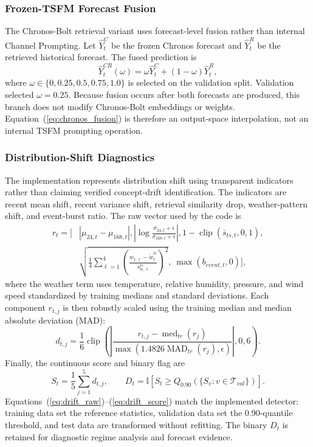 \documentclass{ieeeaccess}
\begin{document}
\subsubsection{Frozen-TSFM Forecast Fusion}
The Chronos-Bolt retrieval variant uses forecast-level fusion rather than internal
Channel Prompting. Let $\hat{Y}^{C}_t$ be the frozen Chronos forecast and
$\hat{Y}^{R}_t$ be the retrieved historical forecast. The fused prediction is
\begin{equation}
    \hat{Y}^{CR}_t(\omega) =
    \omega \hat{Y}^{C}_t + (1-\omega)\hat{Y}^{R}_t,
    \label{eq:chronos_fusion}
\end{equation}
where $\omega \in \{0,0.25,0.5,0.75,1.0\}$ is selected on the validation split.
Validation selected $\omega=0.25$. Because fusion occurs after both forecasts
are produced, this branch does not modify Chronos-Bolt embeddings or weights.
Equation~(\ref{eq:chronos_fusion}) is therefore an output-space interpolation,
not an internal TSFM prompting operation.

\subsubsection{Distribution-Shift Diagnostics}
The implementation represents distribution shift using transparent indicators
rather than claiming verified concept-drift identification. The indicators are
recent mean shift, recent variance shift, retrieval similarity drop,
weather-pattern shift, and event-burst ratio. The raw vector used by the code is
\begin{equation}
\begin{aligned}
r_t=\bigg[&|\mu_{24,t}-\mu_{168,t}|,
\left|\log\frac{\sigma_{24,t}+\epsilon}{\sigma_{168,t}+\epsilon}\right|,
1-\operatorname{clip}(\bar{s}_{ts,t},0,1),\\
&\sqrt{\frac{1}{4}\sum_{\ell=1}^{4}
\left(\frac{w_{t,\ell}-\widetilde{w}^{tr}_{\ell}}
{s^{tr}_{w,\ell}}\right)^2},\ \max(b_{event,t},0)\bigg],
\end{aligned}
\label{eq:drift_raw}
\end{equation}
where the weather term uses temperature, relative humidity, pressure, and wind
speed standardized by training medians and standard deviations. Each component
$r_{t,j}$ is then robustly scaled using the training median and median absolute
deviation (MAD):
\begin{equation}
d_{t,j}=\frac{1}{6}\operatorname{clip}\left(
\left|\frac{r_{t,j}-\operatorname{med}_{tr}(r_j)}
{\max(1.4826\operatorname{MAD}_{tr}(r_j),\epsilon)}\right|,0,6\right).
\label{eq:drift_scale}
\end{equation}
Finally, the continuous score and binary flag are
\begin{equation}
S_t=\frac{1}{5}\sum_{j=1}^{5}d_{t,j},\qquad
D_t=\mathbb{I}\!\left[S_t\geq
Q_{0.90}\!\left(\{S_v:v\in\mathcal{T}_{val}\}\right)\right].
\label{eq:drift_score}
\end{equation}
Equations~(\ref{eq:drift_raw})--(\ref{eq:drift_score}) match the implemented
detector: training data set the reference statistics, validation data set the
0.90-quantile threshold, and test data are transformed without refitting. The
binary $D_t$ is retained for diagnostic regime analysis and forecast evidence.
\end{document}
